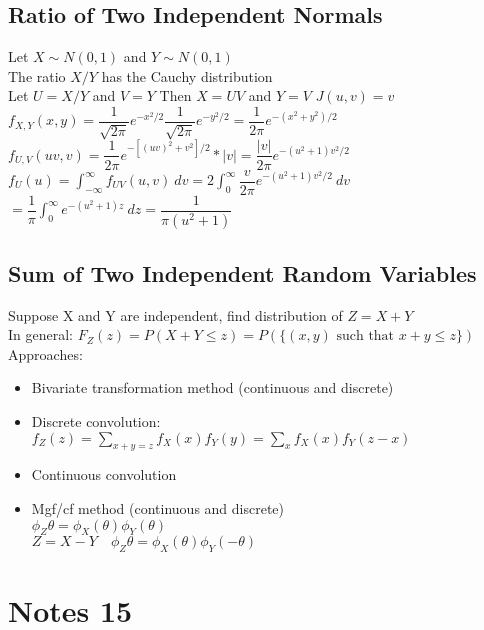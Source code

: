 \documentclass{article}
\begin{document}
\begin{flushleft}
\subsection*{Ratio of Two Independent Normals}
Let $X \sim N(0,1)$ and $Y\sim N(0,1)$\\
The ratio $X/Y$ has the Cauchy distribution\\
Let $U=X/Y$ and $V=Y$ \quad Then $X=UV$ and $Y=V$ \quad $J(u,v)=v$\\
$f_{X,Y}(x,y)=\dfrac{1}{\sqrt{2\pi}}e^{-x^2/2}\dfrac{1}{\sqrt{2\pi}}e^{-y^2/2}=\dfrac{1}{2\pi}e^{-(x^2+y^2)/2}$\\
$f_{U,V}(uv,v)=\dfrac{1}{2\pi}e^{-[(uv)^2+v^2]/2}*|v|=\dfrac{|v|}{2\pi}e^{-(u^2+1)v^2/2}$\\
$f_{U}(u)=\int_{-\infty}^{\infty}f_{UV}(u,v) \ dv=2\int_{0}^{\infty}\dfrac{v}{2\pi}e^{-(u^2+1)v^2/2} \ dv$\\
$=\dfrac{1}{\pi}\int_{0}^{\infty}e^{-(u^2+1)z} \ dz=\dfrac{1}{\pi(u^2+1)}$
\subsection*{Sum of Two Independent Random Variables}
Suppose X and Y are independent, find distribution of $Z=X+Y$\\
In general: $F_Z(z)=P(X+Y\leq z)=P(\{(x,y) \text{ such that } x+y\leq z\})$\\
Approaches:
\begin{itemize}
\item Bivariate transformation method (continuous and discrete)\\
\item Discrete convolution:\\
$f_Z(z)=\sum_{x+y=z}f_X(x)f_Y(y)=\sum_{x}f_X(x)f_Y(z-x)$\\
\item Continuous convolution\\
\item Mgf/cf method (continuous and discrete)\\
$\phi_Z{\theta}=\phi_X(\theta)\phi_Y(\theta)$\\
$Z=X-Y \quad \phi_Z{\theta}=\phi_X(\theta)\phi_Y(-\theta)$
\end{itemize}
\section*{Notes 15}

\end{flushleft}
\end{document}
